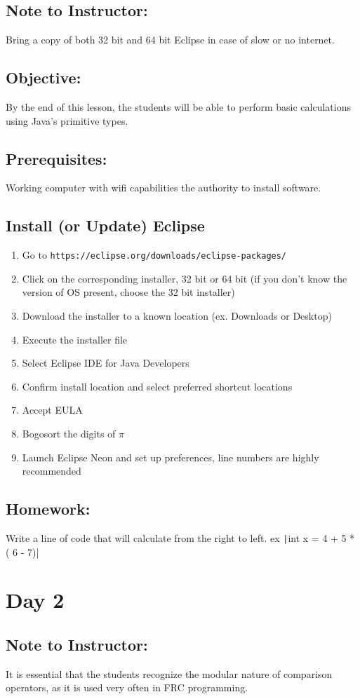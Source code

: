 \documentclass[11pt,fleqn]{article}
\newcommand{\mil}[2][java]{\texttt|#2|}
\begin{document}
\subsection*{Note to Instructor:} Bring a copy of both 32 bit and 64 bit Eclipse in case of slow or no internet.
\subsection*{Objective:} By the end of this lesson, the students will be able to perform basic calculations using Java's primitive types.
\subsection*{Prerequisites:} Working computer with wifi capabilities the authority to install software.
\subsection*{Install (or Update) Eclipse}
\begin{enumerate}
\item Go to \texttt{https://eclipse.org/downloads/eclipse-packages/}
\item Click on the corresponding installer, 32 bit or 64 bit (if you don't know the version of OS present, choose the 32 bit installer)
\item Download the installer to a known location (ex. Downloads or Desktop)
\item Execute the installer file
\item Select Eclipse IDE for Java Developers
\item Confirm install location and select preferred shortcut locations
\item Accept EULA
\item Bogosort the digits of $\pi$
\item Launch Eclipse Neon and set up preferences, line numbers are highly recommended
\end{enumerate}
\subsection*{Homework:} Write a line of code that will calculate from the right to left. ex \mil{int x = 4 + 5 * ( 6 - 7)}
\newpage

\section*{Day 2}
\subsection*{Note to Instructor:} It is essential that the students recognize the modular nature of comparison operators, as it is used very often in FRC programming.
\end{document}
